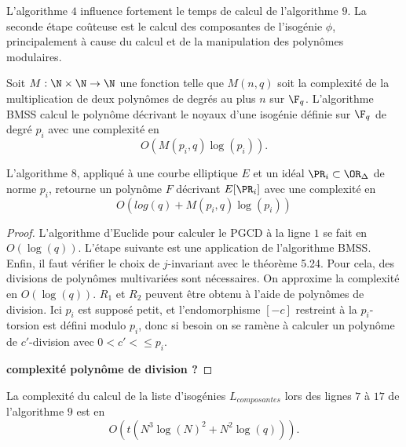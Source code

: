 L'algorithme $4$ influence fortement le temps de calcul de l'algorithme $9$. La seconde étape coûteuse est le calcul des composantes de l'isogénie $\phi$, principalement à cause du calcul et de la manipulation des polynômes modulaires. 

\begin{Prop}\cite{Bostan_2008}
	
	Soit $M : \N\times\N\rightarrow\N$ une fonction telle que $M(n,q)$ soit la complexité de la multiplication de deux polynômes de degrés au plus $n$ sur $\F_{q}$. L'algorithme BMSS calcul le polynôme décrivant le noyaux d'une isogénie définie sur $\F_{q}$ de degré $p_{i}$ avec une complexité en 
	\begin{equation*}
		O\left( M(p_{i},q)\log(p_{i})\right).
	\end{equation*}
\end{Prop}

\begin{Prop}
	L'algorithme 8, appliqué à une courbe elliptique $E$ et un idéal $\PR_{i}\subset\OR_{\Delta}$ de norme $p_{i}$, retourne un polynôme $F$ décrivant $E[\PR_{i}]$ avec une complexité en 
	\begin{equation*}
		O(log(q) + M(p_{i},q)\log(p_{i}))
	\end{equation*}
\end{Prop}

\begin{proof}
	L'algorithme d'Euclide pour calculer le PGCD à la ligne $1$ se fait en $O(\log(q))$. L'étape suivante est une application de l'algorithme BMSS. Enfin, il faut vérifier le choix de $j$-invariant avec le théorème 5.24.
	Pour cela, des divisions de polynômes multivariées sont nécessaires. On approxime la complexité en $O(\log(q))$. $R_{1}$ et $R_{2}$ peuvent être obtenu à l'aide de polynômes de division. Ici $p_{i}$ est supposé petit, et l'endomorphisme $[-c]$ restreint à la $p_i$-torsion est défini modulo $p_{i}$, donc si besoin on se ramène à calculer un polynôme de $c'$-division avec $0<c'<\leq p_{i}$.
	
	\textbf{complexité polynôme de division ?}
\end{proof}

\begin{Prop}
	La complexité du calcul de la liste d'isogénies $L_{composantes}$ lors des lignes $7$ à $17$ de l'algorithme $9$ est en 
	\begin{equation*}
		O\left( t\left(N^3\log(N)^{2} + N^2\log(q) \right) \right). 
	\end{equation*}
	
\end{Prop}

